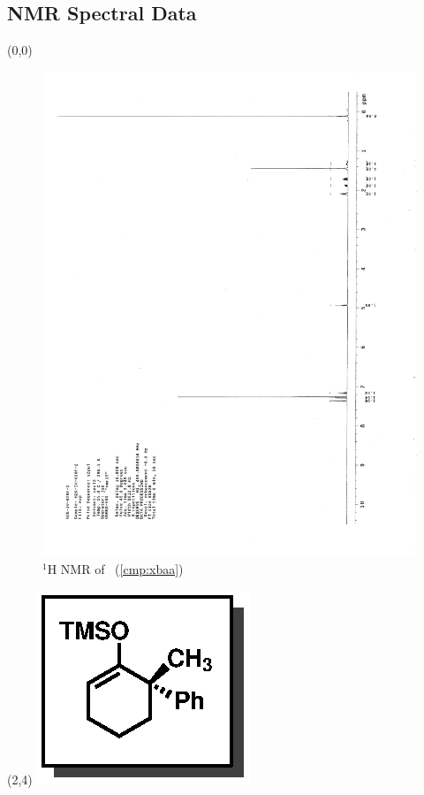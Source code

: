 \subsection{NMR Spectral Data}


\begin{textblock}{20}(0,0)
\begin{figure}[htb]
\caption{$^1$H NMR of \CMPxbaa\ (\ref{cmp:xbaa})}
\includegraphics[scale=0.75, trim = 0mm 0mm 0mm 5mm,
clip]{chp_singlecarbon/images/nmr/xbaaH}
\vspace{-100pt}
\end{figure}
\end{textblock}
\begin{textblock}{1}(2,4)
\includegraphics[scale=0.8, angle=90]{chp_singlecarbon/images/xbaa}
\end{textblock}
